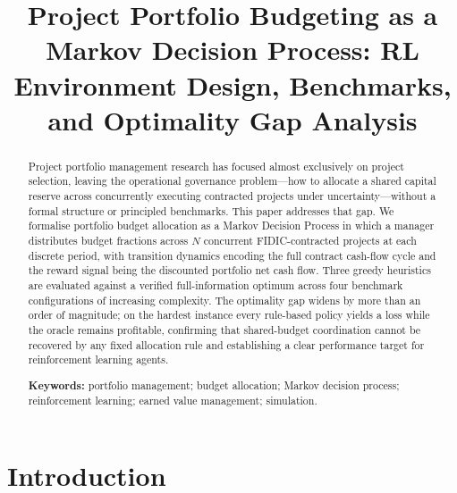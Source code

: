 \documentclass[11pt,a4paper]{article}
\title{\textbf{Project Portfolio Budgeting as a Markov Decision Process:
RL Environment Design, Benchmarks, and Optimality Gap Analysis}}
\author{}
\date{}
\theoremstyle{definition}
\theoremstyle{remark}
\begin{document}
\maketitle


\begin{abstract}

  Project portfolio management research has focused almost exclusively on
  project selection, leaving the operational governance problem---how to
  allocate a shared capital reserve across concurrently executing contracted
  projects under uncertainty---without a formal structure or principled
  benchmarks. This paper addresses that gap. We formalise portfolio budget
  allocation as a Markov Decision Process in which a manager distributes
  budget fractions across $N$ concurrent FIDIC-contracted projects at each
  discrete period, with transition dynamics encoding the full contract
  cash-flow cycle and the reward signal being the discounted portfolio net
  cash flow. Three greedy heuristics are evaluated against a verified
  full-information optimum across four benchmark configurations of increasing
  complexity. The optimality gap widens by more than an order of magnitude;
  on the hardest instance every rule-based policy yields a loss while the
  oracle remains profitable, confirming that shared-budget coordination cannot
  be recovered by any fixed allocation rule and establishing a clear
  performance target for reinforcement learning agents.

  \medskip
  \noindent\textbf{Keywords:} portfolio management; budget allocation;
  Markov decision process; reinforcement learning; earned value management;
  simulation.

  \end{abstract}

\FloatBarrier


\section{Introduction}
\label{sec:introduction}


\FloatBarrier

\end{document}
